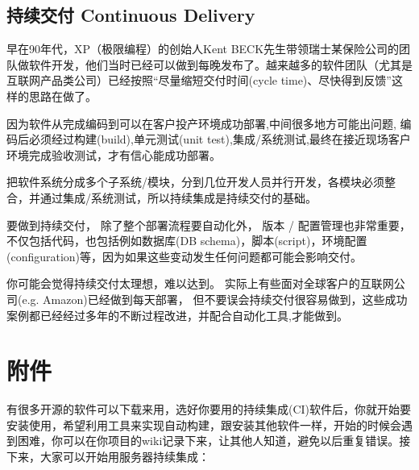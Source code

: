 \hypertarget{ux6301ux7eedux4ea4ux4ed8-continuous-delivery}{%
\subsection{持续交付 Continuous
Delivery}\label{ux6301ux7eedux4ea4ux4ed8-continuous-delivery}}

早在90年代，XP（极限编程）的创始人Kent
BECK先生带领瑞士某保险公司的团队做软件开发，他们当时已经可以做到每晚发布了。越来越多的软件团队（尤其是互联网产品类公司）已经按照``尽量缩短交付时间(cycle
time)、尽快得到反馈''这样的思路在做了。

因为软件从完成编码到可以在客户投产环境成功部署,中间很多地方可能出问题,
编码后必须经过构建(build),单元测试(unit
test),集成/系统测试,最终在接近现场客户环境完成验收测试，才有信心能成功部署。

把软件系统分成多个子系统/模块，分到几位开发人员并行开发，各模块必须整合，并通过集成/系统测试，所以持续集成是持续交付的基础。

要做到持续交付， 除了整个部署流程要自动化外， 版本 /
配置管理也非常重要， 不仅包括代码，也包括例如数据库(DB
schema)，脚本(script)，环境配置(configuration)等，因为如果这些变动发生任何问题都可能会影响交付。

你可能会觉得持续交付太理想，难以达到。
实际上有些面对全球客户的互联网公司(e.g. Amazon)已经做到每天部署，
但不要误会持续交付很容易做到，这些成功案例都已经经过多年的不断过程改进，并配合自动化工具,才能做到。

\hypertarget{ux9644ux4ef6}{%
\section{附件}\label{ux9644ux4ef6}}



有很多开源的软件可以下载来用，选好你要用的持续集成(CI)软件后，你就开始要安装使用，希望利用工具来实现自动构建，跟安装其他软件一样，开始的时候会遇到困难，你可以在你项目的wiki记录下来，让其他人知道，避免以后重复错误。接下来，大家可以开始用服务器持续集成：

